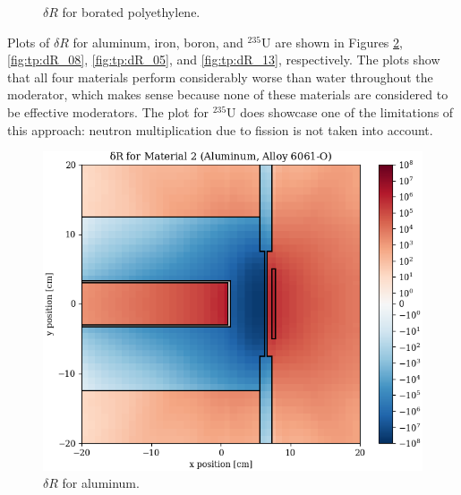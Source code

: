 \begin{figure}
\begin{minipage}{0.49\linewidth}
    \caption{$\delta R$ for borated polyethylene.}
    \label{fig:tp:dR_09}
  \end{minipage}
\end{figure}

Plots of $\delta R$ for aluminum, iron, boron, and ${}^{235}\text{U}$ are shown in Figures \ref{fig:tp:dR_02}, \ref{fig:tp:dR_08}, \ref{fig:tp:dR_05}, and \ref{fig:tp:dR_13}, respectively.
The plots show that all four materials perform considerably worse than water throughout the moderator, which makes sense because none of these materials are considered to be effective moderators.
The plot for ${}^{235}\text{U}$ does showcase one of the limitations of this approach: neutron multiplication due to fission is not taken into account.

\begin{figure}
  \begin{minipage}{0.49\linewidth}
    \centering
    \includegraphics[width=\linewidth]{content/testprob/dR_02.png}
    \caption{$\delta R$ for aluminum.}
    \label{fig:tp:dR_02}
  \end{minipage}
  \hfill
  \begin{minipage}{0.49\linewidth}
    \centering

\end{minipage}
\end{figure}
